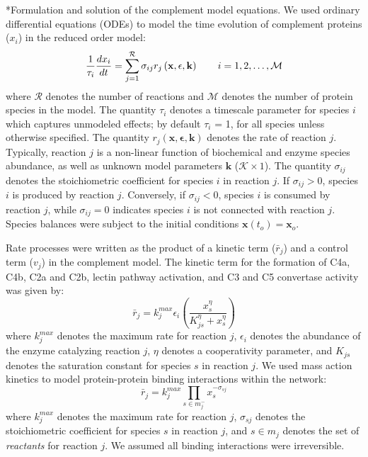 \documentclass[12pt]{article}
\makeatletter
\renewcommand\subsection{\@startsection
	{subsection}{2}{0mm}
	{-0.05in}
	{-0.5\baselineskip}
	{\normalfont\normalsize\bfseries}}
\makeatother
\begin{document}
\subsection*{Formulation and solution of the complement model equations.}
We used ordinary differential equations (ODEs) to model the time evolution of complement proteins ($x_{i}$) in the reduced order model:
\begin{equation}
	\frac{1}{\tau_{i}}\frac{dx_{i}}{dt}  =  \sum_{j = 1}^{\mathcal{R}}\sigma_{ij}r_{j}\left(\mathbf{x},\mathbf{\epsilon},\mathbf{k}\right)\qquad{i=1,2,\hdots,\mathcal{M}}\\
\end{equation}
where $\mathcal{R}$ denotes the number of reactions and $\mathcal{M}$ denotes the number of protein species in the model.
The quantity $\tau_{i}$ denotes a timescale parameter for species $i$ which captures unmodeled effects; by default $\tau_{i}$ = 1, for all species unless otherwise specified.
The quantity $r_{j}\left(\mathbf{x},\mathbf{\epsilon},\mathbf{k}\right)$ denotes the rate of reaction $j$.
Typically, reaction $j$ is a non-linear function of biochemical and enzyme species abundance, as well as unknown model parameters $\mathbf{k}$ ($\mathcal{K}\times{1}$).
The quantity $\sigma_{ij}$ denotes the stoichiometric coefficient for species $i$ in reaction $j$.
If $\sigma_{ij}>0$, species $i$ is produced by reaction $j$.
Conversely, if $\sigma_{ij}<0$, species $i$ is consumed by reaction $j$, while $\sigma_{ij} = 0$ indicates species $i$ is not connected with reaction $j$.
Species balances were subject to the initial conditions $\mathbf{x}\left(t_{o}\right) = \mathbf{x}_{o}$.

Rate processes were written as the product of a kinetic term ($\bar{r}_{j}$) and a control term ($v_{j}$) in the complement model.
The kinetic term for the formation of C4a, C4b, C2a and C2b, lectin pathway activation, and C3 and C5 convertase activity was given by:
\begin{equation}\label{eqn:rate-saturation}
	\bar{r}_{j} = k_{j}^{max}\epsilon_{i}\left(\frac{x_{s}^{\eta}}{K_{js}^{\eta} + x_{s}^{\eta}}\right)
\end{equation}
where $k_{j}^{max}$ denotes the maximum rate for reaction $j$, $\epsilon_{i}$ denotes the abundance of the enzyme catalyzing reaction $j$,
$\eta$ denotes a cooperativity parameter, and $K_{js}$ denotes the saturation constant for species $s$ in reaction $j$.
We used mass action kinetics to model protein-protein binding interactions within the network:
\begin{equation}\label{eqn:rate-action}
	\bar{r}_{j} = k_{j}^{max}\prod_{s\in{m_{j}^{-}}}x_{s}^{-\sigma_{sj}}
\end{equation}
where $k_{j}^{max}$ denotes the maximum rate for reaction $j$, $\sigma_{sj}$ denotes the stoichiometric coefficient for species $s$ in reaction $j$,
and $s\in{m_{j}}$ denotes the set of \textit{reactants} for reaction $j$. We assumed all binding interactions were irreversible.
\end{document}
